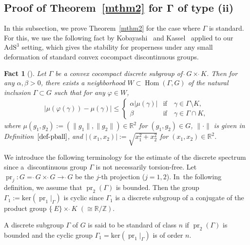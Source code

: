 \documentclass[10pt,a4paper]{amsart}
\numberwithin{equation}{section}
\newtheorem{Fact}[Theorem]{Fact}
 { \theoremstyle{definition}
\newtheorem{Definition}[Theorem]{Definition}
\newtheorem{Note}[Theorem]{Note}
\newtheorem{Example}[Theorem]{Example}
\newtheorem{Remark}[Theorem]{Remark}
\newtheorem{Setting}[Theorem]{Setting}
\newtheorem{Notation}[Theorem]{Notation}
}
\begin{document}
\subsection[Proof of Theorem~1.4 for Gamma of type (ii)]
{Proof of Theorem~\ref{mthm2} for $\boldsymbol\Gamma$ of type ($\boldsymbol {ii}$)}

In this subsection, we prove Theorem~\ref{mthm2} for the case
where $\Gamma$ is standard.
For this, we use the following fact by Kobayashi~\cite{Kob98} and Kassel~\cite{Ka12}
applied to our $\mathrm{AdS}^{3}$ setting, which gives the stability for properness
under any small deformation of standard convex cocompact discontinuous groups.
\begin{Fact}[{\cite[Theorem~1.4]{Ka12}}]
\label{deform}
Let $\Gamma$ be a convex cocompact discrete subgroup of $\grave{\ }G \times \grave{\ }K$.
Then for any $\alpha,\beta>0$,
there exists a neighborhood $W\subset\operatorname{Hom}(\Gamma,G)$
of the natural inclusion $\Gamma \subset G$ such that
for any $\varphi\in W$,
\begin{align*}
\left|\mu(\varphi(\gamma))-\mu(\gamma)\right|\leq
\begin{cases}
\alpha\left|\mu(\gamma)\right|&\text{if}\quad\gamma \in \Gamma\setminus K,\\
\beta&\text{if}\quad\gamma \in \Gamma\cap K,
\end{cases}
\end{align*}
where $\mu(g_{1},g_{2}):=(\|g_{1}\|,\|g_{2}\|)\in\mathbb{R}^{2}$ for $(g_{1},g_{2})\in G$,
$\|\cdot\|$ is given in Definition~$\ref{def-pball}$,
and $\left|(x_1,x_2)\right|:=\sqrt{x_{1}^{2} + x_{2}^{2}}$ for $(x_{1},x_{2})\in\mathbb{R}^2$.
\end{Fact}

We introduce the following terminology for the estimate of the discrete spectrum
since a~discontinuous group $\Gamma$ is not necessarily torsion-free.
Let $\operatorname{pr}_{j}\colon G=\grave{\ }G\times\grave{\ }G
\rightarrow \grave{\ }G$
be the $j$-th projection ($j=1,2$). In~the following definition, we assume that $\operatorname{pr}_{2}(\Gamma)$ is bounded.
Then the group $\Gamma_1:=\mathrm{ker}(\operatorname{pr}_{1}|_{\Gamma})$ is cyclic
since $\Gamma_1$ is a discrete subgroup of a conjugate of the product group
$\{\grave{\ }E\}\times\grave{\ }K$ $(\cong \mathbb{R}/\mathbb{Z})$.


\begin{Definition}
\label{classn}
A discrete subgroup $\Gamma$ of $G$ is said to be standard of class $n$
if $\operatorname{pr}_{2}(\Gamma)$ is bounded and
the cyclic group $\Gamma_1=\mathrm{ker}(\operatorname{pr}_{1}|_{\Gamma})$
is of order $n$.
\end{Definition}
\end{document}
